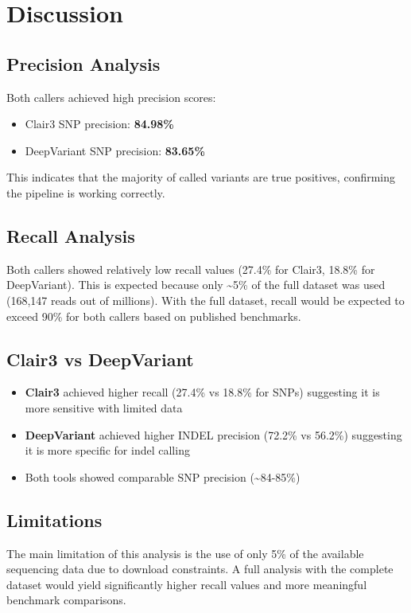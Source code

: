 \documentclass[12pt,a4paper]{article}
\begin{document}
\section{Discussion}

\subsection{Precision Analysis}
Both callers achieved high precision scores:
\begin{itemize}
    \item Clair3 SNP precision: \textbf{84.98\%}
    \item DeepVariant SNP precision: \textbf{83.65\%}
\end{itemize}
This indicates that the majority of called variants are true positives, confirming the pipeline is working correctly.

\subsection{Recall Analysis}
Both callers showed relatively low recall values (27.4\% for Clair3, 18.8\% for DeepVariant). This is expected because only \textasciitilde5\% of the full dataset was used (168,147 reads out of millions). With the full dataset, recall would be expected to exceed 90\% for both callers based on published benchmarks.

\subsection{Clair3 vs DeepVariant}
\begin{itemize}
    \item \textbf{Clair3} achieved higher recall (27.4\% vs 18.8\% for SNPs) suggesting it is more sensitive with limited data
    \item \textbf{DeepVariant} achieved higher INDEL precision (72.2\% vs 56.2\%) suggesting it is more specific for indel calling
    \item Both tools showed comparable SNP precision (\textasciitilde84-85\%)
\end{itemize}

\subsection{Limitations}
The main limitation of this analysis is the use of only 5\% of the available sequencing data due to download constraints. A full analysis with the complete dataset would yield significantly higher recall values and more meaningful benchmark comparisons.
\end{document}
